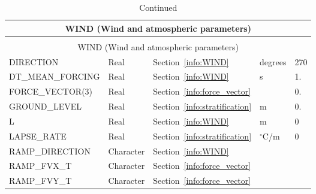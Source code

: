 \documentclass[11pt]{book}
\begin{document}
\begin{longtable}{@{\extracolsep{\fill}}|l|l|l|l|l|}
\caption[Wind and atmospheric parameters ({\ct WIND} namelist group)]{For more information see Section~\ref{info:WIND}.}
\label{tbl:WIND} \\
\hline
\multicolumn{5}{|c|}{{\ct WIND} (Wind and atmospheric parameters)} \\
\hline \hline
\endfirsthead
\caption[]{Continued} \\
\hline
\multicolumn{5}{|c|}{{\ct WIND} (Wind and atmospheric parameters)} \\
\hline \hline
\endhead
{\ct DIRECTION}                                 & Real          & Section~\ref{info:WIND}                       & degrees       & 270               \\ \hline
{\ct DT\_MEAN\_FORCING}                         & Real          & Section~\ref{info:WIND}                       & s             & 1.                \\ \hline
{\ct FORCE\_VECTOR(3)}                          & Real          & Section~\ref{info:force_vector}               &               & 0.                \\ \hline
{\ct GROUND\_LEVEL}                             & Real          & Section~\ref{info:stratification}             & m             & 0.                \\ \hline
{\ct L}                                         & Real          & Section~\ref{info:WIND}                       & m             & 0                 \\ \hline
{\ct LAPSE\_RATE}                               & Real          & Section~\ref{info:stratification}             & $^\circ$C/m   & 0                 \\ \hline
{\ct RAMP\_DIRECTION}                           & Character     & Section~\ref{info:WIND}                       &               &                   \\ \hline
{\ct RAMP\_FVX\_T}                              & Character     & Section~\ref{info:force_vector}               &               &                   \\ \hline
{\ct RAMP\_FVY\_T}                              & Character     & Section~\ref{info:force_vector}               &               &                   \\ \hline

\end{longtable}
\end{document}
